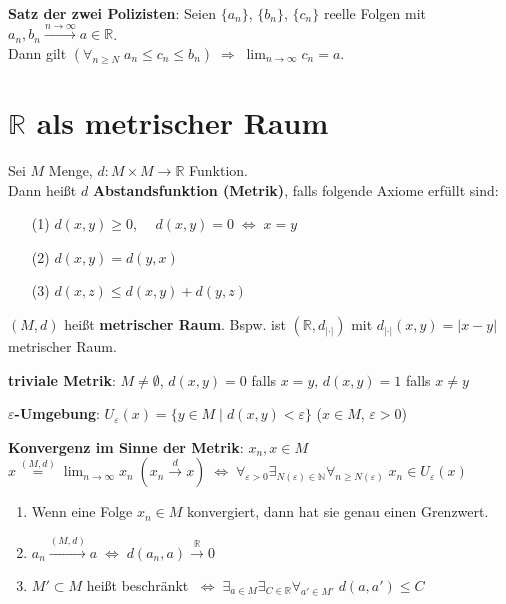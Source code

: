 \textbf{Satz der zwei Polizisten}: Seien $\{a_n\}$, $\{b_n\}$, $\{c_n\}$
reelle Folgen mit $a_n, b_n \xrightarrow{n \to \infty} a \in \mathbb{R}$. \\
Dann gilt
$(\forall_{n \ge N}\; a_n \le c_n \le b_n) \;\Rightarrow\;
\lim_{n \to \infty} c_n = a$.

\section{%
    \texorpdfstring{$\mathbb{R}$ als metrischer Raum}{ℝ als metrischer Raum}%
}

Sei $M$ Menge, $d: M \times M \rightarrow \mathbb{R}$ Funktion. \\
Dann heißt $d$ \textbf{Abstandsfunktion (Metrik)}, falls folgende Axiome
erfüllt sind:

\begin{itemize}
    \item[(1)] $d(x,y) \ge 0$, $\quad d(x,y) = 0 \;\Leftrightarrow\; x = y$
    \item[(2)] $d(x,y) = d(y,x)$
    \item[(3)] $d(x,z) \le d(x,y) + d(y,z)$
\end{itemize}

$(M,d)$ heißt \textbf{metrischer Raum}. Bspw. ist $(\mathbb{R},d_{|\cdot|})$
mit $d_{|\cdot|}(x,y) = |x - y|$ metrischer Raum.

\textbf{triviale Metrik}:
$M \not= \emptyset$, $d(x,y) = 0$ falls $x = y$, $d(x,y) = 1$ falls $x \not= y$

\textbf{$\varepsilon$-Umgebung}:
$U_\varepsilon(x) = \{y \in M \;|\; d(x,y) < \varepsilon\}$
($x \in M$, $\varepsilon > 0$)

\linie

\textbf{Konvergenz im Sinne der Metrik}: $x_n, x \in M$ \\
$x \overset{(M,d)}{=} \lim_{n \to \infty} x_n \; (x_n \xrightarrow{d} x)
\;\Leftrightarrow\;
\forall_{\varepsilon > 0} \exists_{N(\varepsilon) \in \mathbb{N}}
\forall_{n \ge N(\varepsilon)}\; x_n \in U_\varepsilon(x)$

\begin{enumerate}
    \item Wenn eine Folge $x_n \in M$
    konvergiert, dann hat sie genau einen Grenzwert.

    \item $a_n \xrightarrow{(M,d)} a \;\Leftrightarrow\;
    d(a_n, a) \xrightarrow{\mathbb{R}} 0$

    \item $M' \subset M$ heißt beschränkt $\;\Leftrightarrow\;
    \exists_{a \in M} \exists_{C \in \mathbb{R}} \forall_{a' \in M'}\;
    d(a, a') \le C$
\end{enumerate}

